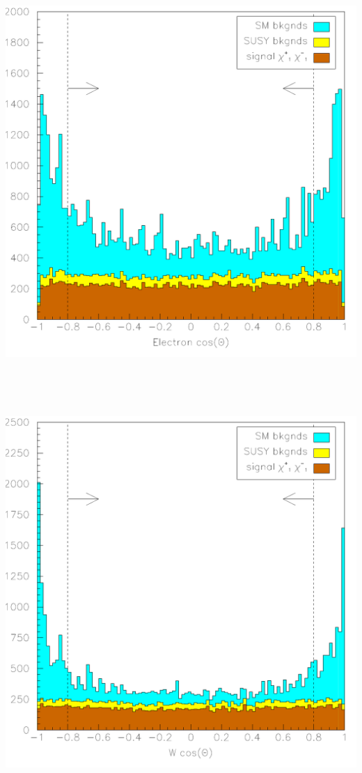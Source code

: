 \documentclass[landscape]{article}
\begin{document}
\mbox{ }

\vfill

\begin{center}
  \includegraphics[width=0.7\linewidth]{allnew_6.pdf}
\end{center}

\vfill

\mbox{ }

\pagebreak

\mbox{ }

\vfill

\begin{center}
  \includegraphics[width=0.7\linewidth]{allnew_7.pdf}
\end{center}

\vfill

\mbox{ }

\pagebreak
\end{document}
